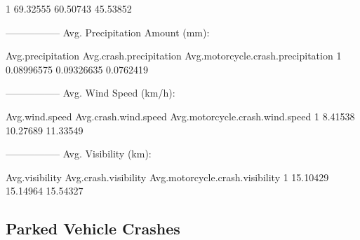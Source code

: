 \documentclass[11pt, a4paper]{article}
\begin{document}
\begin{Schunk}
\begin{Soutput}
1     69.32555           60.50743                      45.53852
\end{Soutput}
\begin{Soutput}
-----------------
Avg. Precipitation Amount (mm):
\end{Soutput}
\begin{Soutput}
  Avg.precipitation Avg.crash.precipitation Avg.motorcycle.crash.precipitation
1        0.08996575              0.09326635                          0.0762419
\end{Soutput}
\begin{Soutput}
-----------------
Avg. Wind Speed (km/h):
\end{Soutput}
\begin{Soutput}
  Avg.wind.speed Avg.crash.wind.speed Avg.motorcycle.crash.wind.speed
1        8.41538             10.27689                        11.33549
\end{Soutput}
\begin{Soutput}
-----------------
Avg. Visibility (km):
\end{Soutput}
\begin{Soutput}
  Avg.visibility Avg.crash.visibility Avg.motorcycle.crash.visibility
1       15.10429             15.14964                        15.54327
\end{Soutput}
\end{Schunk}



\pagebreak
\subsection{Parked Vehicle Crashes}
\end{document}
